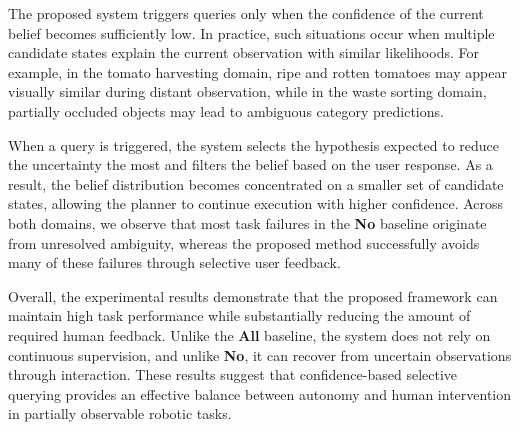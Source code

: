 The proposed system triggers queries only when the confidence of the current belief becomes sufficiently low. In practice, such situations occur when multiple candidate states explain the current observation with similar likelihoods. For example, in the tomato harvesting domain, ripe and rotten tomatoes may appear visually similar during distant observation, while in the waste sorting domain, partially occluded objects may lead to ambiguous category predictions.

When a query is triggered, the system selects the hypothesis expected to reduce the uncertainty the most and filters the belief based on the user response. As a result, the belief distribution becomes concentrated on a smaller set of candidate states, allowing the planner to continue execution with higher confidence. Across both domains, we observe that most task failures in the \textbf{No} baseline originate from unresolved ambiguity, whereas the proposed method successfully avoids many of these failures through selective user feedback.




Overall, the experimental results demonstrate that the proposed framework can maintain high task performance while substantially reducing the amount of required human feedback. Unlike the \textbf{All} baseline, the system does not rely on continuous supervision, and unlike \textbf{No}, it can recover from uncertain observations through interaction. These results suggest that confidence-based selective querying provides an effective balance between autonomy and human intervention in partially observable robotic tasks. 



